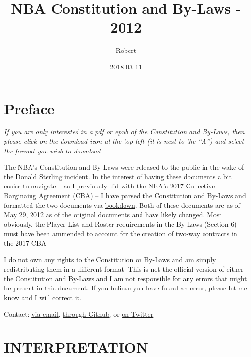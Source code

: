 \documentclass[]{book}
\title{NBA Constitution and By-Laws - 2012}
\author{Robert}
\date{2018-03-11}
\theoremstyle{definition}
\theoremstyle{definition}
\theoremstyle{definition}
\theoremstyle{remark}
\begin{document}
\maketitle

{
\setcounter{tocdepth}{1}
\tableofcontents
}
\chapter*{Preface}\label{preface}

\emph{If you are only interested in a pdf or epub of the Constitution
and By-Laws, then please click on the download icon at the top left (it
is next to the ``A'') and select the format you wish to download.}

The NBA's Constitution and By-Laws were
\href{http://prawfsblawg.blogs.com/files/221035054-nba-constitution-and-by-laws.pdf}{released
to the public} in the wake of the
\href{https://deadspin.com/that-secret-nba-constitution-is-now-online-1569509012}{Donald
Sterling incident}. In the interest of having these documents a bit
easier to navigate -- as I previously did with the NBA's
\href{https://atlhawksfanatic.github.io/NBA-CBA/}{2017 Collective
Barginaing Agreement} (CBA) -- I have parsed the Constitution and
By-Laws and formatted the two documents via
\href{https://bookdown.org/yihui/bookdown/}{bookdown}. Both of these
documents are as of May 29, 2012 as of the original documents and have
likely changed. Most obviously, the Player List and Roster requirements
in the By-Laws (Section 6) must have been ammended to account for the
creation of
\href{https://atlhawksfanatic.github.io/NBA-CBA/uniform-player-contract.html\#two-way-contracts.}{two-way
contracts} in the 2017 CBA.

I do not own any rights to the Constitution or By-Laws and am simply
redistributing them in a different format. This is not the official
version of either the Constitution and By-Laws and I am not responsible
for any errors that might be present in this document. If you believe
you have found an error, please let me know and I will correct it.

Contact: \href{atlhawksfanatic@gmail.com}{via email},
\href{https://github.com/atlhawksfanatic}{through Github}, or
\href{https://twitter.com/atlhawksfanatic}{on Twitter}

\chapter{INTERPRETATION}\label{interpretation}
\end{document}
